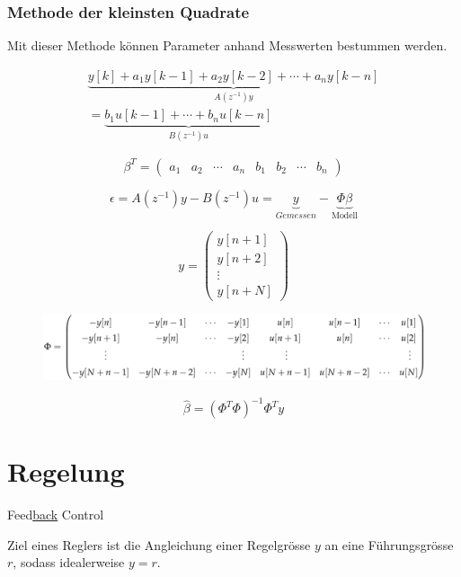 \documentclass[
  10pt,
  a4paper,
  twocolumn]{article}
\numberwithin{equation}{section}
\begin{document}
\hypertarget{methode-der-kleinsten-quadrate}{%
\subsubsection{Methode der kleinsten
Quadrate}\label{methode-der-kleinsten-quadrate}}

Mit dieser Methode können Parameter anhand Messwerten bestummen werden.

\[
\begin{array}{r}
\underbrace{y[k]+a_1y[k-1]+a_2y[k-2]+\cdots+a_ny[k-n]}_{A(z^{-1})y}\\
= \underbrace{b_1u[k-1]+\cdots+b_nu[k-n]}_{B(z^{-1})u}
\end{array}
\]

\[
\beta^T=\begin{pmatrix}
a_1 & a_2 & \cdots & a_n & b_1 & b_2 & \cdots & b_n
\end{pmatrix}
\]

\[
\epsilon = A(z^{-1})y-B(z^{-1})u = \underbrace{y}_{Gemessen}-\underbrace{\Phi\beta}_{\text{Modell}}
\]

\[
y = \begin{pmatrix}
  y[n+1]\\
  y[n+2]\\
  \vdots\\
  y[n+N]
\end{pmatrix}
\]

\begin{figure}[H]

{\centering \includegraphics{images/paste-36.png}

}

\end{figure}

\[
\hat{\beta} = (\Phi^T\Phi)^{-1}\Phi^Ty
\]

\hypertarget{regelung}{%
\section{Regelung}\label{regelung}}

Feed\ul{back} Control

Ziel eines Reglers ist die Angleichung einer Regelgrösse \(y\) an eine
Führungsgrösse \(r\), sodass idealerweise \(y=r\).
\end{document}
